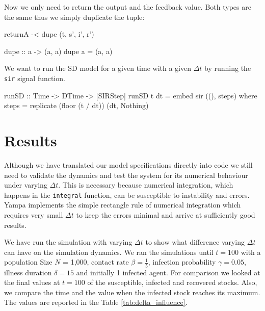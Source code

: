 Now we only need to return the output and the feedback value. Both types are the same thus we simply duplicate the tuple:

\begin{HaskellCode}
returnA -< dupe (t, s', i', r')

dupe :: a -> (a, a)
dupe a = (a, a)
\end{HaskellCode}

We want to run the SD model for a given time with a given $\Delta t$ by running the \texttt{sir} signal function.

\begin{HaskellCode}
runSD :: Time -> DTime -> [SIRStep]
runSD t dt = embed sir ((), steps)
  where
    steps = replicate (floor (t / dt)) (dt, Nothing)
\end{HaskellCode}

\section{Results}
Although we have translated our model specifications directly into code we still need to validate the dynamics and test the system for its numerical behaviour under varying $\Delta t$. This is necessary because numerical integration, which happens in the \texttt{integral} function, can be susceptible to instability and errors. Yampa implements the simple rectangle rule of numerical integration which requires very small $\Delta t$ to keep the errors minimal and arrive at sufficiently good results. 

We have run the simulation with varying $\Delta t$ to show what difference varying $\Delta t$ can have on the simulation dynamics. We ran the simulations until $t = 100$ with a population Size $N$ = 1,000, contact rate $\beta = \frac{1}{5}$, infection probability $\gamma = 0.05$, illness duration $\delta = 15$ and initially 1 infected agent. For comparison we looked at the final values at $t = 100$ of the susceptible, infected and recovered stocks. Also, we compare the time and the value when the infected stock reaches its maximum. The values are reported in the Table \ref{tab:delta_influence}.

